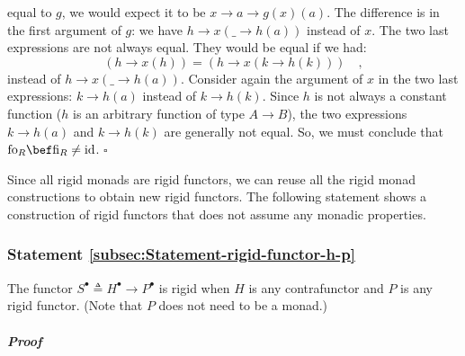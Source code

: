 equal to $g$, we would expect it to be $x\rightarrow a\rightarrow g(x)(a)$.
The difference is in the first argument of $g$: we have $h\rightarrow x(\_\rightarrow h(a))$
instead of $x$. The two last expressions are not always equal. They
would be equal if we had:
\[
\left(h\rightarrow x(h)\right)=\left(h\rightarrow x(k\rightarrow h(k))\right)\quad,
\]
instead of $h\rightarrow x(\_\rightarrow h(a))$. Consider again the
argument of $x$ in the two last expressions: $k\rightarrow h(a)$
instead of $k\rightarrow h(k)$. Since $h$ is not always a constant
function ($h$ is an arbitrary function of type $A\rightarrow B$),
the two expressions $k\rightarrow h(a)$ and $k\rightarrow h(k)$
are generally not equal. So, we must conclude that $\text{fo}_{R}\bef\text{fi}_{R}\neq\text{id}$.
$\square$

Since all rigid monads are rigid functors, we can reuse all the rigid
monad constructions to obtain new rigid functors. The following statement
shows a construction of rigid functors that does not assume any monadic
properties. 

\subsubsection{Statement \label{subsec:Statement-rigid-functor-h-p}\ref{subsec:Statement-rigid-functor-h-p}}

The functor $S^{\bullet}\triangleq H^{\bullet}\rightarrow P^{\bullet}$
is rigid when $H$ is any contrafunctor and $P$ is any rigid functor.
(Note that $P$ does not need to be a monad.)

\subparagraph{Proof}

